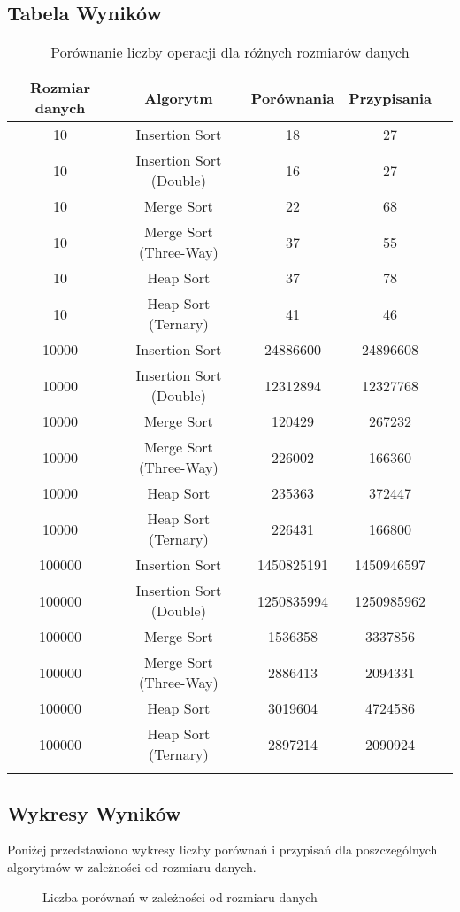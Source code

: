\documentclass[a4paper,12pt]{article}
\begin{document}
\subsection{Tabela Wyników}
\begin{longtable}{|c|c|c|c|c|}
\hline
Rozmiar danych & Algorytm & Porównania & Przypisania \\
\hline
10 & Insertion Sort & 18 & 27 \\
10 & Insertion Sort (Double) & 16 & 27 \\
10 & Merge Sort & 22 & 68 \\
10 & Merge Sort (Three-Way) & 37 & 55 \\
10 & Heap Sort & 37 & 78 \\
10 & Heap Sort (Ternary) & 41 & 46 \\
\hline
10000 & Insertion Sort & 24886600 & 24896608 \\
10000 & Insertion Sort (Double) & 12312894 & 12327768 \\
10000 & Merge Sort & 120429 & 267232 \\
10000 & Merge Sort (Three-Way) & 226002 & 166360 \\
10000 & Heap Sort & 235363 & 372447 \\
10000 & Heap Sort (Ternary) & 226431 & 166800 \\
\hline
100000 & Insertion Sort & 1450825191 & 1450946597 \\
100000 & Insertion Sort (Double) & 1250835994 & 1250985962 \\
100000 & Merge Sort & 1536358 & 3337856 \\
100000 & Merge Sort (Three-Way) & 2886413 & 2094331 \\
100000 & Heap Sort & 3019604 & 4724586 \\
100000 & Heap Sort (Ternary) & 2897214 & 2090924 \\
\hline
\caption{Porównanie liczby operacji dla różnych rozmiarów danych}
\label{tab:results}
\end{longtable}

\subsection{Wykresy Wyników}
Poniżej przedstawiono wykresy liczby porównań i przypisań dla poszczególnych algorytmów w zależności od rozmiaru danych.

\begin{figure}[H]
    \centering
    \caption{Liczba porównań w zależności od rozmiaru danych}
\end{figure}
\end{document}
